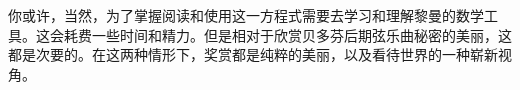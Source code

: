    你或许，当然，为了掌握阅读和使用这一方程式需要去学习和理解黎曼的数学工具。这会耗费一些时间和精力。但是相对于欣赏贝多芬后期弦乐曲秘密的美丽，这都是次要的。在这两种情形下，奖赏都是纯粹的美丽，以及看待世界的一种崭新视角。

\noindent
\iffalse
	\graybox{.8}{.65}{
		\bc\textcolor{gray}{\Large{\sffamily Notation used in this document:}}\ec

		\textbf{Abbreviations:}

		EM: electro-magnetic,\\
		UV: ultra-violet,\\
		$\gamma$: gamma-rays,\\
		X: X-rays,\\
		$e^-$: electron,\\
		$\pi$: pion,\\
		$\mu$: muon,\\
		$\nu$: neutrino, etc.\vspace{2ex}

		\textbf{Units:}\\
		International System:\\
		eV: electron volts,\\
		J: Joules,\\
		C: Celsius,\\
		M: mega,\\
		G: giga, etc.\vspace{2ex}

		\textbf{Chemical symbols:}\\
		The elements of the periodic table.\vspace{2ex}

		\textbf{References:}\\
		There are internal (marked in \textcolor{red}{red}) and external (marked in \textcolor{blue}{blue}) references.\vspace{2ex}
	}
\fi
